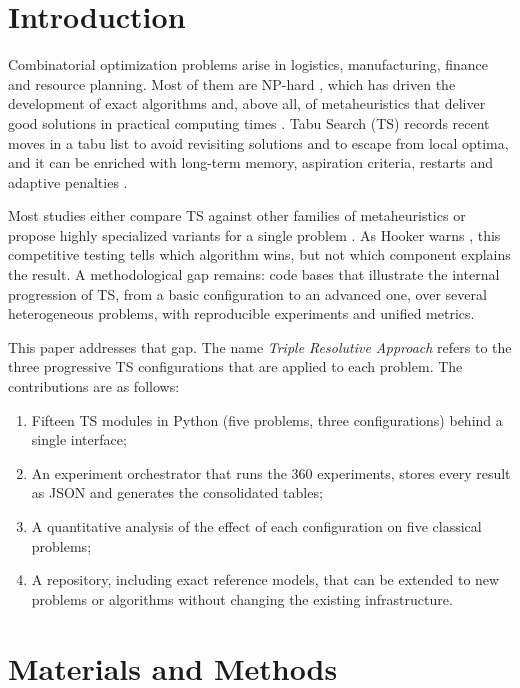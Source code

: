 \documentclass[engproc,proceedingpaper,submit,moreauthors]{Definitions/mdpi}
\begin{document}
\section{Introduction}

Combinatorial optimization problems arise in logistics, manufacturing, finance and resource planning. Most of them are NP-hard \cite{garey1979computers}, which has driven the development of exact algorithms and, above all, of metaheuristics that deliver good solutions in practical computing times \cite{gendreau2010handbook,blum2003metaheuristics}. Tabu Search (TS) \cite{glover1986future,glover1989tabu,glover1990tabu} records recent moves in a tabu list to avoid revisiting solutions and to escape from local optima, and it can be enriched with long-term memory, aspiration criteria, restarts and adaptive penalties \cite{glover1997tabu}.

Most studies either compare TS against other families of metaheuristics or propose highly specialized variants for a single problem \cite{gendreau1994tabu,cordeau2001unified,nowicki1996fast}. As Hooker warns \cite{hooker1995testing}, this competitive testing tells which algorithm wins, but not which component explains the result. A methodological gap remains: code bases that illustrate the internal progression of TS, from a basic configuration to an advanced one, over several heterogeneous problems, with reproducible experiments and unified metrics.

This paper addresses that gap. The name \emph{Triple Resolutive Approach} refers to the three progressive TS configurations that are applied to each problem. The contributions are as follows:
\begin{enumerate}
\item Fifteen TS modules in Python (five problems, three configurations) behind a single interface;
\item An experiment orchestrator that runs the 360 experiments, stores every result as JSON and generates the consolidated tables;
\item A quantitative analysis of the effect of each configuration on five classical problems;
\item A repository, including exact reference models, that can be extended to new problems or algorithms without changing the existing infrastructure.
\end{enumerate}

\section{Materials and Methods}
\end{document}
